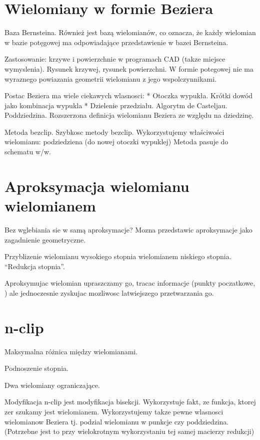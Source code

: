 \documentclass[11pt,a4paper,oneside]{report}
\begin{document}
\section{Wielomiany w formie Beziera}

Baza Bernsteina. Również jest bazą wielomianów, co oznacza, że każdy wielomian w bazie potęgowej ma odpowiadające przedstawienie w bazei Bernsteina.

Zastosowanie: krzywe i powierzchnie w programach CAD (takze miejsce wymyslenia). Rysunek krzywej, rysunek powierzchni. W formie potegowej nie ma wyraznego powiazania geometrii wielomianu z jego wspolczynnikami. 

Postac Beziera ma wiele ciekawych wlasnosci:
* Otoczka wypukła. Krótki dowód jako kombinacja wypukla
* Dzielenie przedziału. Algorytm de Casteljau. Poddziedzina. Rozszerzona definicja wielomianu Beziera ze względu na dziedzinę.

Metoda bezclip. Szybkosc metody bezclip.
Wykorzystujemy właściwości wielomianu: podziedziena (do nowej otoczki wypuklej)
Metoda pasuje do schematu w/w.

\section{Aproksymacja wielomianu wielomianem}

Bez wglebiania sie w samą aproksymacje? Mozna przedstawic aproksymacje jako zagadnienie geometryczne.

Przyblizenie wielomianu wysokiego stopnia wielomianem niskiego stopnia. ``Redukcja stopnia''. 

Aproksymujac wielomian upraszczamy go, tracac informacje (punkty poczatkowe, ) ale jednoczesnie zyskujac mozliwosc latwiejszego przetwarzania go.

\section{n-clip}

Maksymalna różnica między wielomianami.

Podnoszenie stopnia.

Dwa wielomiany ograniczające.

Modyfikacja n-clip jest modyfikacja bisekcji. Wykorzystuje fakt, ze funkcja, ktorej zer szukamy jest wielomianem. Wykorzystujemy takze pewne wlasnosci wielomianow Beziera tj. podzial wielomianu w punkcje czy poddziedzina. (Potrzebne jest to przy wielokrotnym wykorzystaniu tej samej macierzy redukcji)
\end{document}
